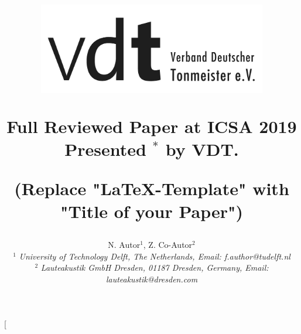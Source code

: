 \documentclass[a4paper, 10pt, twocolumn]{article}
\begin{document}
\fancyhf{} %

\chead{\underline{\sffamily\large\textcolor{gray}{5th International Conference on Spatial Audio ICSA, September 2019}}}
\renewcommand{\headrulewidth}{0pt}
\rhead{}
\renewcommand{\headrulewidth}{0pt}
\rhead{}


\date{}											%

\title{
\vspace{-5mm}%
\mbox{\includegraphics[height=4cm]{VDT}}
%
\vspace{7mm}%
%
\begin{center}
\textbf{\Huge Full Reviewed Paper at ICSA 2019}\\
{ Presented  $^*$ by VDT.}
\end{center}
\vspace{10mm}%
\begin{center}
\textbf\mdseries(Replace "\LaTeX-Template" with "Title of your Paper")
\end{center}
%
\mbox{}\vspace{-11mm}
%
}

\author{ %
%
N. Autor$^1$, Z. Co-Autor$^2$\\
%
$^1$ \textit{\large %
University of Technology Delft, The Netherlands, Email: f.author@tudelft.nl
}\\
%
$^2$ \emph{\large %
Lauteakustik GmbH Dresden, 01187 Dresden, Germany, Email: lauteakustik@dresden.com
}
%
}
%

\twocolumn[
\maketitle
\thispagestyle{fancy}
%
\end{document}
